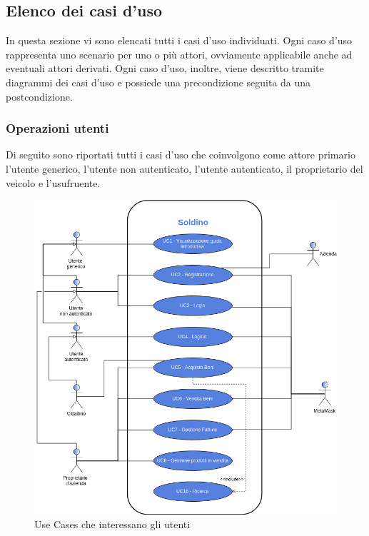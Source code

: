 \subsection{Elenco dei casi d'uso}
In questa sezione vi sono elencati tutti i casi d'uso individuati. Ogni caso d'uso rappresenta uno scenario per uno o più attori, ovviamente applicabile anche ad eventuali attori derivati. Ogni caso d'uso, inoltre, viene descritto tramite diagrammi dei casi d'uso e possiede una precondizione seguita da una postcondizione.
\subsubsection*{Operazioni utenti}
Di seguito sono riportati tutti i casi d'uso che coinvolgono come attore primario l'utente generico, l'utente non autenticato, l'utente autenticato, il proprietario del veicolo e l'usufruente.

\begin{figure}[H]
	\includegraphics[width=14cm]{res/images/UseCase1-8.png}
	\centering
	\caption{Use Cases che interessano gli utenti}
\end{figure}






\pagebreak
